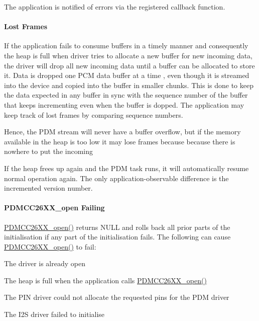 The application is notified of errors via the registered callback function.

\paragraph*{Lost Frames}

If the application fails to consume buffers in a timely manner and consequently the heap is full when driver tries to allocate a new buffer for new incoming data, the driver will drop all new incoming data until a buffer can be allocated to store it. Data is dropped one P\+C\+M data buffer at a time , even though it is streamed into the device and copied into the buffer in smaller chunks. This is done to keep the data expected in any buffer in sync with the sequence number of the buffer that keeps incrementing even when the buffer is dopped. The application may keep track of lost frames by comparing sequence numbers.

Hence, the P\+D\+M stream will never have a buffer overflow, but if the memory available in the heap is too low it may lose frames because because there is nowhere to put the incoming

If the heap frees up again and the P\+D\+M task runs, it will automatically resume normal operation again. The only application-\/observable difference is the incremented version number.

\paragraph*{P\+D\+M\+C\+C26\+X\+X\+\_\+open Failing}

\hyperlink{_p_d_m_c_c26_x_x_8h_a431d9b71e0d0eebd5ab85960f1c82ee0}{P\+D\+M\+C\+C26\+X\+X\+\_\+open()} returns N\+U\+L\+L and rolls back all prior parts of the initialisation if any part of the initialisation fails. The following can cause \hyperlink{_p_d_m_c_c26_x_x_8h_a431d9b71e0d0eebd5ab85960f1c82ee0}{P\+D\+M\+C\+C26\+X\+X\+\_\+open()} to fail\+:
\begin{DoxyItemize}
\item The driver is already open
\item The heap is full when the application calls \hyperlink{_p_d_m_c_c26_x_x_8h_a431d9b71e0d0eebd5ab85960f1c82ee0}{P\+D\+M\+C\+C26\+X\+X\+\_\+open()}
\item The P\+I\+N driver could not allocate the requested pins for the P\+D\+M driver
\item The I2\+S driver failed to initialise
\end{DoxyItemize}


